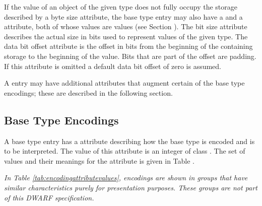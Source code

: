 If the value of an object of the given type does not fully
occupy the storage described by a byte size 
attribute,\hypertarget{chap:DWATdatabitoffsetbasetypebitlocation}{}
the base type entry may also have a 
\DWATbitsizeDEFN{} and a \DWATdatabitoffsetDEFN{} attribute,
both of whose values are
 values
(see Section ). 
The bit size
attribute describes the actual size in bits used to represent
values of the given type. The data bit offset attribute is the
offset in bits from the beginning of the containing storage to
the beginning of the value. Bits that are part of the offset
are padding. 
\bbeb
If this attribute is omitted a default data bit offset
of zero is assumed.

A \DWTAGbasetype{} entry may have additional attributes that
augment certain of the base type encodings; these are described
in the following section.

\subsection{Base Type Encodings}
\label{chap:basetypeencodings}
A base type entry has 
a \DWATencoding{} attribute describing
how the base type is encoded and is to be interpreted. The 
value of this attribute is an integer of class \CLASSconstant.
The set of values and their meanings for the
\DWATencoding{} attribute is given in 
Table .

\textit{In Table \ref{tab:encodingattributevalues}, encodings
are shown in groups that have similar characteristics purely
for presentation purposes. These groups are not part of this
DWARF specification.}

